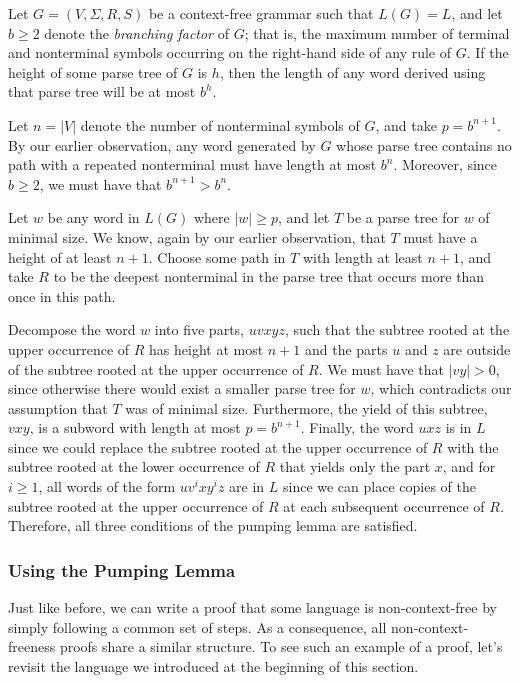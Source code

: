 \begin{proofbox}
Let $G = (V, \Sigma, R, S)$ be a context-free grammar such that $L(G) = L$, and let $b \geq 2$ denote the \emph{branching factor} of $G$; that is, the maximum number of terminal and nonterminal symbols occurring on the right-hand side of any rule of $G$. If the height of some parse tree of $G$ is $h$, then the length of any word derived using that parse tree will be at most $b^{h}$.

Let $n = |V|$ denote the number of nonterminal symbols of $G$, and take $p = b^{n + 1}$. By our earlier observation, any word generated by $G$ whose parse tree contains no path with a repeated nonterminal must have length at most $b^{n}$. Moreover, since $b \geq 2$, we must have that $b^{n+1} > b^{n}$.

Let $w$ be any word in $L(G)$ where $|w| \geq p$, and let $T$ be a parse tree for $w$ of minimal size. We know, again by our earlier observation, that $T$ must have a height of at least $n + 1$. Choose some path in $T$ with length at least $n + 1$, and take $R$ to be the deepest nonterminal in the parse tree that occurs more than once in this path.

Decompose the word $w$ into five parts, $uvxyz$, such that the subtree rooted at the upper occurrence of $R$ has height at most $n + 1$ and the parts $u$ and $z$ are outside of the subtree rooted at the upper occurrence of $R$. We must have that $|vy| > 0$, since otherwise there would exist a smaller parse tree for $w$, which contradicts our assumption that $T$ was of minimal size. Furthermore, the yield of this subtree, $vxy$, is a subword with length at most $p = b^{n + 1}$. Finally, the word $uxz$ is in $L$ since we could replace the subtree rooted at the upper occurrence of $R$ with the subtree rooted at the lower occurrence of $R$ that yields only the part $x$, and for $i \geq 1$, all words of the form $uv^{i}xy^{i}z$ are in $L$ since we can place copies of the subtree rooted at the upper occurrence of $R$ at each subsequent occurrence of $R$. Therefore, all three conditions of the pumping lemma are satisfied.
\end{proofbox}

\subsubsection*{Using the Pumping Lemma}

Just like before, we can write a proof that some language is non-context-free by simply following a common set of steps. As a consequence, all non-context-freeness proofs share a similar structure. To see such an example of a proof, let's revisit the language we introduced at the beginning of this section.

